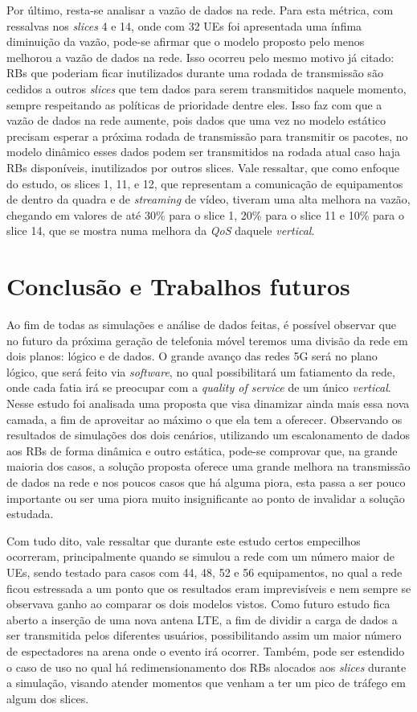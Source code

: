 \documentclass[11pt,twoside]{article}
\begin{document}
	Por último, resta-se analisar a vazão de dados na rede. Para esta métrica, com ressalvas nos \textit{slices} 4 e 14, onde com 32 UEs foi apresentada uma ínfima diminuição da vazão, pode-se afirmar que o modelo proposto pelo menos melhorou a vazão de dados na rede. Isso ocorreu pelo mesmo motivo já citado: RBs que poderiam ficar inutilizados durante uma rodada de transmissão são cedidos a outros \textit{slices} que tem dados para serem transmitidos naquele momento, sempre respeitando as políticas de prioridade dentre eles. Isso faz com que a vazão de dados na rede aumente, pois dados que uma vez no modelo estático precisam esperar a próxima rodada de transmissão para transmitir os pacotes, no modelo dinâmico esses dados podem ser transmitidos na rodada atual caso haja RBs disponíveis, inutilizados por outros slices. Vale ressaltar, que como enfoque do estudo, os slices 1, 11, e 12, que representam a comunicação de equipamentos de dentro da quadra e de \textit{streaming} de vídeo, tiveram uma alta melhora na vazão, chegando em valores de até 30\% para o slice 1, 20\% para o slice 11 e 10\% para o slice 14, que se mostra numa melhora da \textit{QoS} daquele \textit{vertical}.

\section{Conclusão e Trabalhos futuros}

	Ao fim de todas as simulações e análise de dados feitas, é possível observar que no futuro da próxima geração de telefonia móvel teremos uma divisão da rede em dois planos: lógico e de dados. O grande avanço das redes 5G será no plano lógico, que será feito via \textit{software}, no qual possibilitará um fatiamento da rede, onde cada fatia irá se preocupar com a \textit{quality of service} de um único \textit{vertical}. Nesse estudo foi analisada uma proposta que visa dinamizar ainda mais essa nova camada, a fim de aproveitar ao máximo o que ela tem a oferecer. Observando os resultados de simulações dos dois cenários, utilizando um escalonamento de dados aos RBs de forma dinâmica e outro estática, pode-se comprovar que, na grande maioria dos casos, a solução proposta oferece uma grande melhora na transmissão de dados na rede e nos poucos casos que há alguma piora, esta passa a ser pouco importante ou ser uma piora muito insignificante ao ponto de invalidar a solução estudada.

	Com tudo dito, vale ressaltar que durante este estudo certos empecilhos ocorreram, principalmente quando se simulou a rede com um número maior de UEs, sendo testado para casos com 44, 48, 52 e 56 equipamentos, no qual a rede ficou estressada a um ponto que os resultados eram imprevisíveis e nem sempre se observava ganho ao comparar os dois modelos vistos. Como futuro estudo fica aberto a inserção de uma nova antena LTE, a fim de dividir a carga de dados a ser transmitida pelos diferentes usuários, possibilitando assim um maior número de espectadores na arena onde o evento irá ocorrer. Também, pode ser estendido o caso de uso no qual há redimensionamento dos RBs alocados aos \textit{slices} durante a simulação, visando atender momentos que venham a ter um pico de tráfego em algum dos slices.
\end{document}
